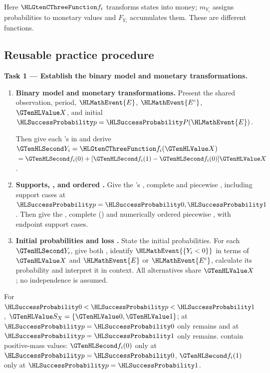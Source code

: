 Here $\TransformationFunction{f_i}$ transforms states into money; $m_{Y_i}$ assigns probabilities to
monetary values and $F_{Y_i}$ accumulates them. These are different functions.

\clearpage{}\subsection{Reusable practice procedure}
\textbf{Task 1 --- Establish the binary model and monetary transformations.}
\begin{enumerate}
\item \textbf{Binary model and monetary transformations.} Present the shared observation, period,  $\HLMathEvent{E}$,  $\HLMathEvent{E^c}$,  $\Indicator{X}$,  and initial $\SuccessProb{p}=\SuccessProb{P}(\HLMathEvent{E})$.\par Then give each 's  in  and derive $\Money{Y_i}=\TransformationFunction{f_i}(\Indicator{X})$\allowbreak${}=\Money{f_i(0)}+[\Money{f_i(1)}-\Money{f_i(0)}]\Indicator{X}$.
\item \textbf{Supports, , and ordered .} Give the 's , complete  and piecewise , including support cases at $\SuccessProb{p}=\SuccessProb{0},\SuccessProb{1}$. Then give the , complete  () and numerically ordered piecewise , with endpoint support cases.
\item \textbf{Initial probabilities and loss .} State the initial  probabilities. For each $\Money{Y_i}$, give both , identify $\HLMathEvent{\{Y_i<0\}}$ in terms of $\Indicator{X}$ and $\HLMathEvent{E}$ or $\HLMathEvent{E^c}$, calculate its probability and interpret it in context. All alternatives share $\Indicator{X}$; no independence is assumed.
\end{enumerate}
For $\SuccessProb{0}<\SuccessProb{p}<\SuccessProb{1}$, $\Indicator{S_X}=\{\Indicator{0},\Indicator{1}\}$; at $\SuccessProb{p}=\SuccessProb{0}$ only  remains and at $\SuccessProb{p}=\SuccessProb{1}$ only  remains.
 contain positive-mass values: $\Money{f_i(0)}$ only at $\SuccessProb{p}=\SuccessProb{0}$, $\Money{f_i(1)}$ only at $\SuccessProb{p}=\SuccessProb{1}$.
